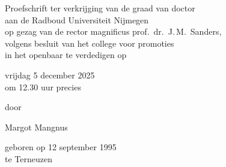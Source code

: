 \begin{titlepage}
\begin{center}
    \vspace*{26pt}
    \makeatother%
    \vspace*{2em}
    Proefschrift ter verkrijging van de graad van doctor\\
    aan de Radboud Universiteit Nijmegen\\
    op gezag van de rector magnificus prof.~dr.~J.\,M.~Sanders,\\
    volgens besluit van het college voor promoties\\
    in het openbaar te verdedigen op

    \vspace*{1em}

    vrijdag 5 december 2025\\
    om 12.30 uur precies

    \vspace*{1em}

    door

    \vspace*{1em}

    Margot Mangnus

    \vspace*{1em}

    geboren op 12 september 1995\\
    te Terneuzen%
    \vspace*{\fill}

\end{center}
\end{titlepage}


